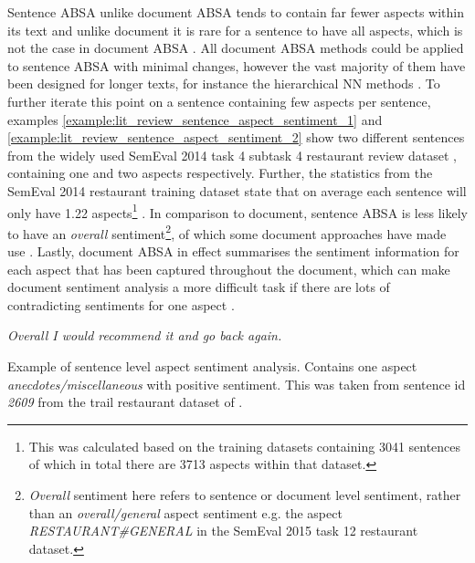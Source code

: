 Sentence ABSA unlike document ABSA tends to contain far fewer aspects within its text and unlike document it is rare for a sentence to have all aspects, which is not the case in document ABSA \citep{snyder-barzilay-2007-multiple, Wang2010LatentAR}. All document ABSA methods could be applied to sentence ABSA with minimal changes, however the vast majority of them have been designed for longer texts, for instance the hierarchical NN methods \citep{yin-etal-2017-document, li-etal-2018-document, wang-etal-2019-human}. To further iterate this point on a sentence containing few aspects per sentence, examples \ref{example:lit_review_sentence_aspect_sentiment_1} and \ref{example:lit_review_sentence_aspect_sentiment_2} show two different sentences from the widely used SemEval 2014 task 4 subtask 4 restaurant review dataset \citep{pontiki-etal-2014-semeval}, containing one and two aspects respectively. Further, the statistics from the SemEval 2014 restaurant training dataset state that on average each sentence will only have 1.22 aspects\footnote{This was calculated based on the training datasets containing 3041 sentences of which in total there are 3713 aspects within that dataset.} \citep{pontiki-etal-2014-semeval}. In comparison to document, sentence ABSA is less likely to have an \textit{overall} sentiment\footnote{\textit{Overall} sentiment here refers to sentence or document level sentiment, rather than an \textit{overall/general} aspect sentiment e.g. the aspect \textit{RESTAURANT\#GENERAL} in the SemEval 2015 task 12 restaurant dataset\citep{pontiki-etal-2015-semeval}.}, of which some document approaches have made use \citep{Wang2010LatentAR, li-etal-2018-document}. Lastly, document ABSA in effect summarises the sentiment information for each aspect that has been captured throughout the document, which can make document sentiment analysis a more difficult task if there are lots of contradicting sentiments for one aspect \citep{pontiki-etal-2016-semeval}.  


\begin{example}
\textit{Overall I would recommend it and go back again.}
\caption{Example of sentence level aspect sentiment analysis. Contains one aspect \textit{anecdotes/miscellaneous} with positive sentiment. This was taken from sentence id \textit{2609} from the trail restaurant dataset of \citet{pontiki-etal-2014-semeval}.}
\label{example:lit_review_sentence_aspect_sentiment_1}
\end{example}

